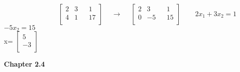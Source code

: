 \documentclass[10pt,twoside,reqno]{article}
\begin{document}
\begin{enumerate}
$
$$
\hspace{95pt}
\begin{bmatrix}
2&3&&1\\
4&1&&17\\
\end{bmatrix}
\hspace{15pt}
\rightarrow
\hspace{15pt}
\begin{bmatrix}
2&3&&1\\
0&-5&&15\\
\end{bmatrix}
\hspace{25pt}
2x_1+3x_2=1
$$
$ \\
\hspace{313pt}
$-5x_2=15$
\\
\hspace{185pt}
x=
$
$$
\begin{bmatrix}
5\\
-3\\
\end{bmatrix}
$$
$
\end{enumerate}
\vspace{5mm}
\textbf{Chapter 2.4}
\end{document}
